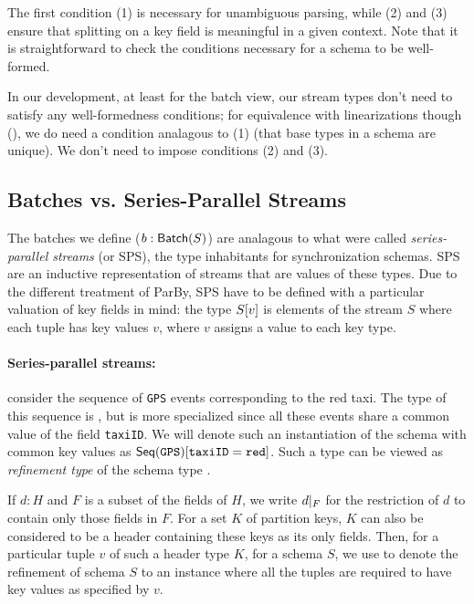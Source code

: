 The first condition (1) is necessary for unambiguous parsing, while (2) and (3)
ensure that splitting on a key field is meaningful in a given context.
Note that it is straightforward to check the conditions necessary for a schema to be well-formed.

In our development, at least for the batch view, our stream types don't need to satisfy any well-formedness conditions; for equivalence with linearizations though (), we do need a condition analagous to (1) (that base types in a schema are unique). We don't need to impose conditions (2) and (3).

\subsection{Batches vs. Series-Parallel Streams}

The batches we define ($\batchtype{b}{S}$) are analagous to what were called
\emph{series-parallel streams} (or SPS), the type inhabitants for synchronization schemas.
SPS are an inductive representation of streams that are values of these types.
Due to the different treatment of ParBy,
SPS have to be defined with a particular valuation of key fields in mind: the type $\spstype{v}{S}$ is elements of the stream $S$ where each tuple has key values $v$, where $v$ assigns a value to each key type.

\paragraph{Series-parallel streams:} consider the sequence of \texttt{GPS} events corresponding
to the red taxi. The type of this sequence is , but is more specialized
since all these events share a common value of the field \texttt{taxiID}.
We will denote such an instantiation of the schema with common key values
as $\spstype{\texttt{taxiID}=\texttt{red}}{\seqleaf{\texttt{GPS}}}$. Such a type can
be viewed as {\em refinement type} of the schema type .

If $d : H$ and $F$ is a subset of the fields of $H$, we write $\tuprestrict{d}{F}$ for
the restriction of $d$ to contain only those fields in $F$.
For a set $K$ of partition keys, $K$ can also be considered to be a header containing these keys as its only fields.
Then, for a particular tuple $v$ of such a header type $K$, for a schema $S$, we use
 to denote the refinement of schema $S$ to an instance where all the tuples
are required to have key values as specified by $v$.

